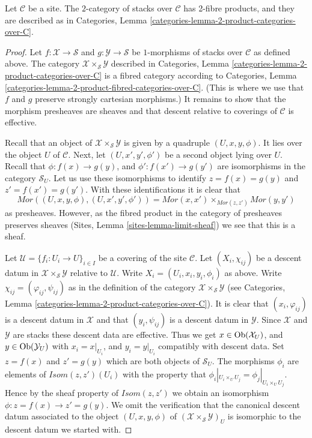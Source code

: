 \begin{lemma}
\label{lemma-2-product-stacks}
Let $\mathcal{C}$ be a site.
The $2$-category of stacks over $\mathcal{C}$
has 2-fibre products, and they are described as in
Categories, Lemma \ref{categories-lemma-2-product-categories-over-C}.
\end{lemma}

\begin{proof}
Let $f : \mathcal{X} \to \mathcal{S}$ and
$g : \mathcal{Y} \to \mathcal{S}$ be
$1$-morphisms of stacks over $\mathcal{C}$
as defined above. The category
$\mathcal{X} \times_\mathcal{S} \mathcal{Y}$
described in
Categories, Lemma \ref{categories-lemma-2-product-categories-over-C} is a
fibred category according to
Categories, Lemma \ref{categories-lemma-2-product-fibred-categories-over-C}.
(This is where we use that $f$ and $g$ preserve strongly cartesian
morphisms.) It remains to show that the morphism presheaves are sheaves
and that descent relative to coverings of $\mathcal{C}$ is effective.

\medskip\noindent
Recall that an object of $\mathcal{X} \times_\mathcal{S} \mathcal{Y}$
is given by a quadruple $(U, x, y, \phi)$.
It lies over the object
$U$ of $\mathcal{C}$. Next, let $(U, x', y', \phi')$ be a second
object lying over $U$.
Recall that $\phi : f(x) \to g(y)$, and $\phi' : f(x') \to g(y')$
are isomorphisms in the category $\mathcal{S}_U$. Let us
use these isomorphisms to identify $z = f(x) = g(y)$ and
$z' = f(x') = g(y')$. With these identifications
it is clear that
$$
\mathit{Mor}((U, x, y, \phi), (U, x', y', \phi'))
=
\mathit{Mor}(x, x')
\times_{\mathit{Mor}(z, z')}
\mathit{Mor}(y, y')
$$
as presheaves. However, as the fibred product in the category of
presheaves preserves sheaves (Sites, Lemma \ref{sites-lemma-limit-sheaf})
we see that this is a sheaf.

\medskip\noindent
Let $\mathcal{U} = \{f_i : U_i \to U\}_{i \in I}$ be a covering of the site
$\mathcal{C}$. Let $(X_i, \chi_{ij})$ be a descent datum
in $\mathcal{X} \times_\mathcal{S} \mathcal{Y}$ relative to $\mathcal{U}$.
Write $X_i = (U_i, x_i, y_i, \phi_i)$ as above. Write
$\chi_{ij} = (\varphi_{ij}, \psi_{ij})$ as in the definition of
the category $\mathcal{X} \times_\mathcal{S} \mathcal{Y}$ (see
Categories, Lemma \ref{categories-lemma-2-product-categories-over-C}).
It is clear that $(x_i, \varphi_{ij})$ is a descent datum in
$\mathcal{X}$ and that $(y_i, \psi_{ij})$ is a descent datum in
$\mathcal{Y}$. Since $\mathcal{X}$ and $\mathcal{Y}$ are stacks these
descent data are effective. Thus we get
$x \in \mathop{\mathrm{Ob}}\nolimits(\mathcal{X}_U)$, and $y \in \mathop{\mathrm{Ob}}\nolimits(\mathcal{Y}_U)$
with $x_i = x|_{U_i}$, and $y_i = y|_{U_i}$ compatibly with descent data.
Set $z = f(x)$ and $z' = g(y)$ which are both objects of $\mathcal{S}_U$.
The morphisms $\phi_i$ are elements of
$\mathit{Isom}(z, z')(U_i)$ with the property that
$\phi_i|_{U_i \times_U U_j} = \phi_j|_{U_i \times_U U_j}$.
Hence by the sheaf property of $\mathit{Isom}(z, z')$
we obtain an isomorphism $\phi : z = f(x) \to z' = g(y)$.
We omit the verification that the canonical descent datum associated to
the object $(U, x, y, \phi)$ of
$(\mathcal{X} \times_\mathcal{S} \mathcal{Y})_U$ is isomorphic
to the descent datum we started with.
\end{proof}

